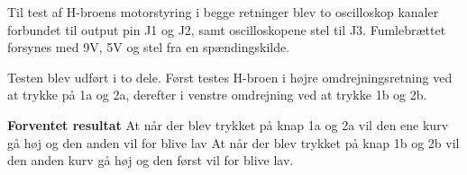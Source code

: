 \noindent Til test af H-broens motorstyring i begge retninger blev to oscilloskop kanaler forbundet til output pin J1 og J2, samt oscilloskopene stel til J3. Fumlebrættet forsynes med 9V, 5V og stel fra en spændingskilde. 

\noindent Testen blev udført i to dele. Først testes H-broen i højre omdrejningsretning ved at trykke på 1a og 2a, derefter i venstre omdrejning ved at trykke 1b og 2b. \newline

\noindent \textbf{Forventet resultat} \newline
At når der blev trykket på knap 1a og 2a vil den ene kurv gå høj og den anden vil for blive lav
At når der blev trykket på knap 1b og 2b vil den anden kurv gå høj og den først vil for blive lav.
\\
\\

